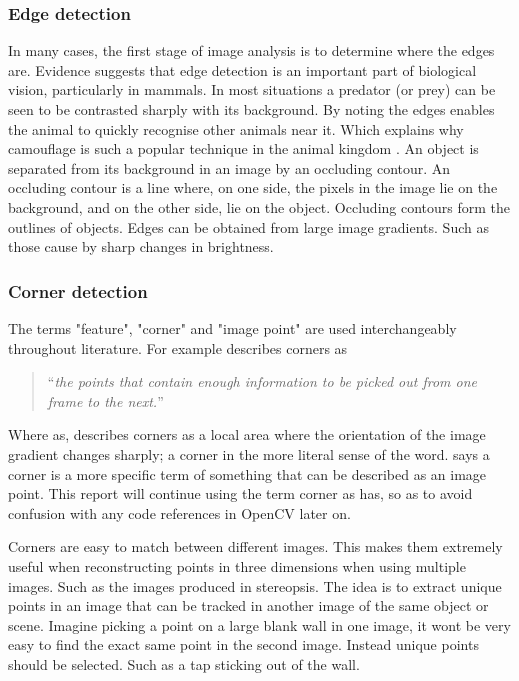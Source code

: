 \documentclass[11pt,oneside]{report}
\begin{document}
					\subsubsection{Edge detection}
					In many cases, the first stage of image analysis is to determine where the edges are.
					Evidence suggests that edge detection is an important part of biological vision, particularly in mammals.
					In most situations a predator (or prey) can be seen to be contrasted sharply with its background.
					By noting the edges enables the animal to quickly recognise other animals near it.
					Which explains why camouflage is such a popular technique in the animal kingdom \cite{book:aiIlluminated}.
					An object is separated from its background in an image by an occluding contour.
					An occluding contour is a line where, on one side, the pixels in the image lie on the background, and on the other side, lie on the object.
					Occluding contours form the outlines of objects.
					Edges can be obtained from large image gradients.
					Such as those cause by sharp changes in brightness.
					\subsubsection{Corner detection}
					The terms "feature", "corner" and "image point" are used interchangeably throughout literature.
					For example  describes corners as
					\begin{quote}
						``\textit{the points that contain enough information to be picked out from one frame to the next.}''
					\end{quote}
					Where as,  describes corners as a local area where the orientation of the image gradient changes sharply; a corner in the more literal sense of the word.
					 says a corner is a more specific term of something that can be described as an image point.
					This report will continue using the term corner as  has, so as to avoid confusion with any code references in OpenCV later on.
					
					Corners are easy to match between different images.
					This makes them extremely useful when reconstructing points in three dimensions when using multiple images.
					Such as the images produced in stereopsis.
					The idea is to extract unique points in an image that can be tracked in another image of the same object or scene.
					Imagine picking a point on a large blank wall in one image, it wont be very easy to find the exact same point in the second image.
					Instead unique points should be selected.
					Such as a tap sticking out of the wall.
					
\end{document}
